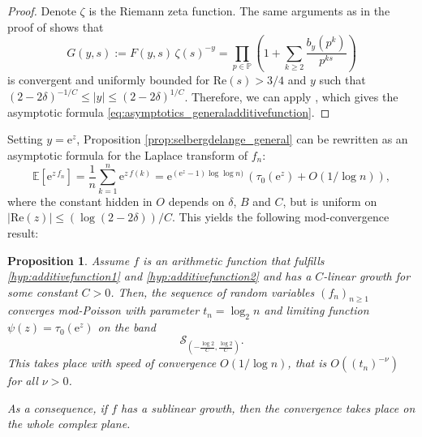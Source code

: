 \documentclass[12pt,a4paper,reqno]{amsart}
\newtheorem{proposition}[lemma]{Proposition}
\theoremstyle{remark}
\newcommand{\E}{\mathrm{e}}
\newcommand{\esper}{\mathbb{E}}
\renewcommand{\Re}{\mathrm{Re}}
\begin{document}
\begin{proof}
Denote $\zeta$ is the Riemann zeta function. The same arguments as in the proof of \cite[Section II.6, Theorem 1]{Ten95} shows that
\[G(y,s):=F(y,s)\, \zeta(s)^{-y} = \prod_{p \in \mathbb{P}} \left (1 + \sum_{k \ge 2} \frac{b_y(p^k)}{p^{ks}} \right)\]
is convergent and uniformly bounded for $\Re(s)>3/4$ and $y $ such that $(2-2\delta)^{-1/C}\le |y| \le (2-2\delta)^{1/C}$.
Therefore, we can apply \cite[Section II.5, Theorem 3]{Ten95}, which gives the asymptotic formula \eqref{eq:asymptotics_generaladditivefunction}.
\end{proof}

Setting $y=\E^z$, Proposition \ref{prop:selbergdelange_general} can be rewritten as an asymptotic formula for the Laplace transform of $f_{n}$:
\[
    \esper[\E^{z\,f_{n}}] = \frac{1}{n} \sum_{k=1}^n \E^{z\,f(k)} 
= \E^{(\E^z-1) \log \log n)} \,(\tau_0(\E^z) + O(1/\log n)),
\]
where the constant hidden in $O$ depends on $\delta$, $B$ and $C$, but is uniform on $|\Re(z)| \le (\log(2-2\delta))/C$. This yields the following mod-convergence result:

\begin{proposition}
Assume $f$ is an arithmetic function that fulfills \eqref{hyp:additivefunction1} and \eqref{hyp:additivefunction2} and has a $C$-linear growth for some constant $C>0$. Then, the sequence of random variables $(f_n)_{ n \ge 1}$
converges mod-Poisson with parameter $t_n=\log_2 n$ and limiting function $\psi(z)=\tau_0(\E^z)$ on the band $$\mathcal{S}_{(-\frac{\log 2}{C},\frac{\log 2}{C})}.$$ 
This takes place with speed of convergence $O(1/\log n)$, that is $O((t_n)^{-\nu})$ for all $\nu >0$.
\medskip

\noindent As a consequence, if $f$ has a sublinear growth, then the convergence takes place on the whole complex plane.
\end{proposition}
\end{document}

